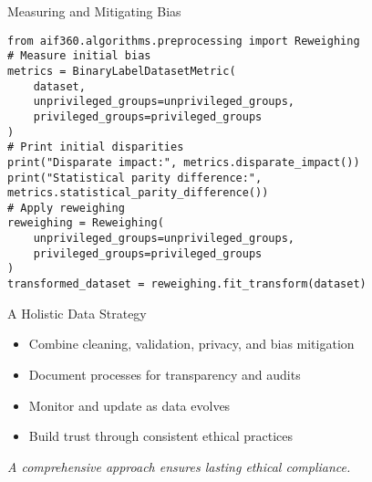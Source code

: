 \documentclass[aspectratio=169]{beamer}
\begin{document}

\begin{frame}[fragile]{Measuring and Mitigating Bias}
\begin{verbatim}
from aif360.algorithms.preprocessing import Reweighing
# Measure initial bias
metrics = BinaryLabelDatasetMetric(
    dataset,
    unprivileged_groups=unprivileged_groups,
    privileged_groups=privileged_groups
)
# Print initial disparities
print("Disparate impact:", metrics.disparate_impact())
print("Statistical parity difference:", metrics.statistical_parity_difference())
# Apply reweighing
reweighing = Reweighing(
    unprivileged_groups=unprivileged_groups,
    privileged_groups=privileged_groups
)
transformed_dataset = reweighing.fit_transform(dataset)
\end{verbatim}

\end{frame}


\begin{frame}{A Holistic Data Strategy}
\begin{itemize}
\item Combine cleaning, validation, privacy, and bias mitigation
\item Document processes for transparency and audits
\item Monitor and update as data evolves
\item Build trust through consistent ethical practices
\end{itemize}

\emph{A comprehensive approach ensures lasting ethical compliance.}
\end{frame}
\end{document}
